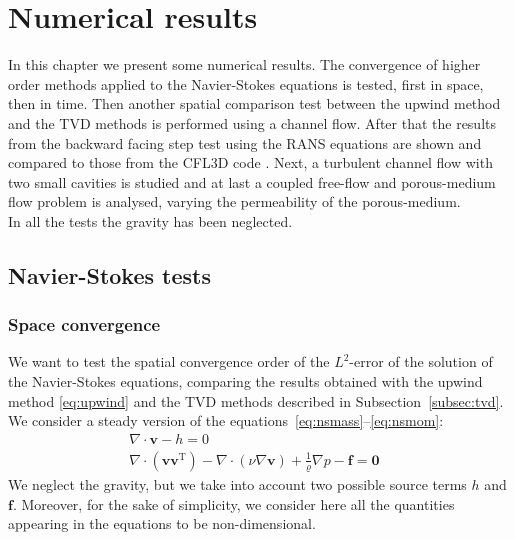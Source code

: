\chapter{Numerical results} \label{chap:results}
In this chapter we present some numerical results. The convergence of higher 
order methods applied to the Navier-Stokes equations is tested, first in space, 
then in time. Then another spatial comparison test between the upwind method 
and the TVD methods is performed using a channel flow. After that the results 
from the backward facing step test using the RANS equations are shown and 
compared to those from the CFL3D code \cite{web:nasa}. Next, a turbulent 
channel flow with two small cavities is studied and at last a coupled free-flow 
and porous-medium flow problem is analysed, varying the permeability of the 
porous-medium.\\
In all the tests the gravity has been neglected.
%
\section{Navier-Stokes tests}
\subsection{Space convergence} \label{subsec:conv}
We want to test the spatial convergence order of the $L^2$-error of the 
solution of the Navier-Stokes equations, comparing the results obtained with 
the upwind method \eqref{eq:upwind} and the TVD methods described in 
Subsection~\ref{subsec:tvd}.\\
We consider a steady version of the 
equations~\eqref{eq:nsmass}--\eqref{eq:nsmom}:
\begin{align}
	\label{eq:nssteadymass} \nabla \cdot \mathbf{v} -h = 0&\\
	\label{eq:nssteadymom} \nabla \cdot (\mathbf{v} \mathbf{v}^\mathrm{T}) - 
	\nabla \cdot (\nu \nabla \mathbf{v}) + \frac{1}{\varrho}\nabla p  
	-\mathbf{f} = \mathbf{0}&
\end{align}
We neglect the gravity, but we take into account two possible source terms 
$h$ and $\mathbf{f}$. Moreover, for the sake of simplicity, we consider here 
all the quantities appearing in the equations to be non-dimensional.
%
